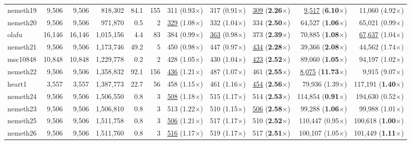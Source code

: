 \begin{table}[t!]
{\begin{tabular}{l|rrrrr|rrr|rr}
    nemeth19 & 9,506 & 9,506 & 818,302 & 84.1 & 155 & 311 (0.93$\times$) & 317 (0.91$\times$) & \underline{309} (\textbf{2.26}$\times$) & \underline{9,517} (\textbf{6.10}$\times$) & 11,060 (4.92$\times$) \\
    nemeth20 & 9,506 & 9,506 & 971,870 & 0.5 & 2 & \underline{329} (1.08$\times$) & 332 (1.04$\times$) & 334 (\textbf{2.50}$\times$) & 64,527 (\textbf{1.06}$\times$) & 65,021 (0.99$\times$) \\
    olafu & 16,146 & 16,146 & 1,015,156 & 4.4 & 83 & 384 (0.99$\times$) & \underline{363} (0.98$\times$) & 373 (\textbf{2.39}$\times$) & 70,885 (\textbf{1.08}$\times$) & \underline{67,637} (1.04$\times$) \\
    nemeth21 & 9,506 & 9,506 & 1,173,746 & 49.2 & 5 & 450 (0.98$\times$) & 447 (0.97$\times$) & \underline{434} (\textbf{2.28}$\times$) & 39,366 (\textbf{2.08}$\times$) & 44,562 (1.74$\times$) \\
    msc10848 & 10,848 & 10,848 & 1,229,778 & 0.2 & 2 & 428 (1.05$\times$) & 430 (1.04$\times$) & \underline{423} (\textbf{2.52}$\times$) & 89,060 (\textbf{1.05}$\times$) & 94,197 (1.02$\times$) \\
    nemeth22 & 9,506 & 9,506 & 1,358,832 & 92.1 & 156 & \underline{436} (1.21$\times$) & 487 (1.07$\times$) & 461 (\textbf{2.55}$\times$) & \underline{8,075} (\textbf{11.73}$\times$) & 9,915 (9.07$\times$) \\
    heart1 & 3,557 & 3,557 & 1,387,773 & 22.7 & 56 & 458 (1.15$\times$) & 461 (1.16$\times$) & \underline{454} (\textbf{2.56}$\times$) & 79,936 (1.39$\times$) & 117,191 (\textbf{1.40}$\times$) \\
    nemeth24 & 9,506 & 9,506 & 1,506,550 & 0.8 & 3 & \underline{508} (1.18$\times$) & 515 (1.17$\times$) & 514 (\textbf{2.53}$\times$) & 114,854 (\textbf{0.91}$\times$) & 194,630 (0.52$\times$) \\
    nemeth23 & 9,506 & 9,506 & 1,506,810 & 0.8 & 3 & 513 (1.22$\times$) & 510 (1.15$\times$) & \underline{506} (\textbf{2.58}$\times$) & 99,288 (\textbf{1.06}$\times$) & 99,988 (1.01$\times$) \\
    nemeth25 & 9,506 & 9,506 & 1,511,758 & 0.8 & 3 & \underline{506} (1.21$\times$) & 517 (1.17$\times$) & 510 (\textbf{2.52}$\times$) & 110,447 (0.95$\times$) & 100,618 (\textbf{1.00}$\times$) \\
    nemeth26 & 9,506 & 9,506 & 1,511,760 & 0.8 & 3 & \underline{516} (1.17$\times$) & 519 (1.17$\times$) & 517 (\textbf{2.51}$\times$) & 100,107 (1.05$\times$) & 101,449 (\textbf{1.11}$\times$) \\

\end{tabular}}
\end{table}
